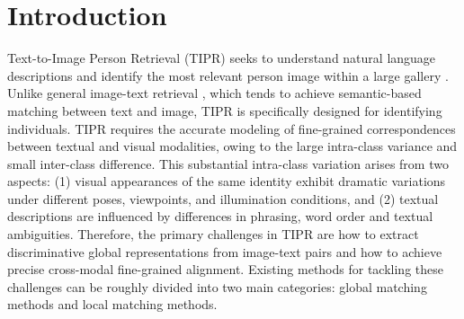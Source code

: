 \documentclass[acmsmall]{acmart}
\begin{document}


 

\maketitle

\section{Introduction}

Text-to-Image Person Retrieval (TIPR) seeks to understand natural
language descriptions and identify the most relevant person image
within a large gallery \cite{lu2019vilbert}. Unlike general
image-text retrieval \cite{wang2017adversarial, sogi2024object,
chen2024make, chen2023vilem, wang2025geometric}, which tends to
achieve semantic-based matching between text and image, TIPR is
specifically designed for identifying individuals. TIPR requires the
accurate modeling of fine-grained correspondences between textual
and visual modalities, owing to the large intra-class variance and
small inter-class difference. This substantial intra-class variation
arises from two aspects: (1) visual appearances of the same identity
exhibit dramatic variations under different poses, viewpoints, and
illumination conditions, and (2) textual descriptions are influenced
by differences in phrasing, word order and textual ambiguities.
Therefore, the primary challenges in TIPR are how to extract
discriminative global representations from image-text pairs and how
to achieve precise cross-modal fine-grained alignment. Existing
methods for tackling these challenges can be roughly divided into
two main categories: global matching methods and local matching
methods.
\end{document}
